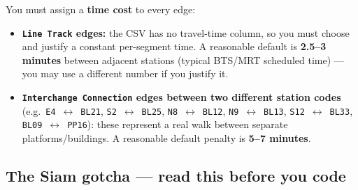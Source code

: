 \documentclass[11pt,a4paper]{article}
\begin{document}
You must assign a \textbf{time cost} to every edge:
\begin{itemize}
  \item \textbf{\texttt{Line Track} edges:} the CSV has no travel-time
        column, so you must choose and justify a constant per-segment
        time. A reasonable default is \textbf{2.5--3 minutes} between
        adjacent stations (typical BTS/MRT scheduled time) --- you may use
        a different number if you justify it.
  \item \textbf{\texttt{Interchange Connection} edges between two different
        station codes} (e.g.\ \texttt{E4}~$\leftrightarrow$~\texttt{BL21},
        \texttt{S2}~$\leftrightarrow$~\texttt{BL25},
        \texttt{N8}~$\leftrightarrow$~\texttt{BL12},
        \texttt{N9}~$\leftrightarrow$~\texttt{BL13},
        \texttt{S12}~$\leftrightarrow$~\texttt{BL33},
        \texttt{BL09}~$\leftrightarrow$~\texttt{PP16}): these represent a
        real walk between separate platforms/buildings. A reasonable
        default penalty is \textbf{5--7 minutes}.
\end{itemize}

\subsection{The Siam gotcha --- read this before you code}
\label{sec:gotcha}
\end{document}
